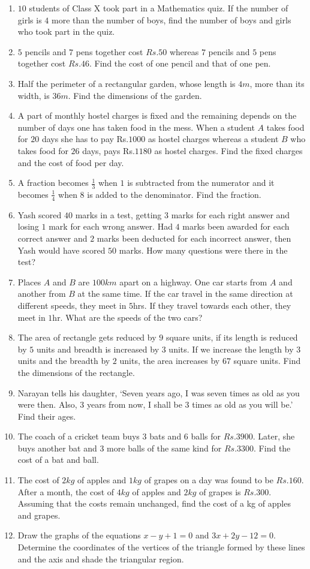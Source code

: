 \begin{enumerate}[label=\thesubsection.\arabic*,ref=\thesubsection.\theenumi, resume*]
\item $10$ students of Class X took part in a Mathematics quiz. If the number of girls is $4$ more than the number of boys, find the number of boys and girls who took part in the quiz.
\item $5$ pencils and $7$ pens together cost $Rs. 50$ whereas $7$ pencils and $5$ pens together cost $Rs. 46$. Find the cost of one pencil and that of one pen.
\item Half the perimeter of a rectangular garden, whose length is $4m$, more than its width, is $36m$. Find the dimensions of the garden.
\item A part of monthly hostel charges is fixed and the remaining depends on the number of days one has taken food in the mess. When a student $A$ takes food for $20$ days she has to pay Rs.$1000$ as hostel charges whereas a student $B$ who takes food for $26$ days, pays Rs.$1180$ as hostel charges. Find the fixed charges and the cost of food per day.
\item A fraction becomes $\frac{1}{3}$ when $1$ is subtracted from the numerator and it becomes $\frac{1}{4}$ when $8$ is added to the denominator. Find the fraction.
\item Yash scored $40$ marks in a test, getting $3$ marks for each right answer and losing $1$ mark for each wrong answer. Had $4$ marks been awarded for each correct answer and $2$ marks been deducted for each incorrect answer, then Yash would have scored $50$ marks. How many questions were there in the test?
\item Places $A$ and $B$ are $100km$ apart on a highway. One car starts from $A$ and another from $B$ at the same time. If the car travel in the same direction at different speeds, they meet in $5$hrs. If they travel towards each other, they meet in $1$hr. What are the speeds of the two cars?
\item The area of rectangle gets reduced by $9$ square units, if its length is reduced by $5$ units and breadth is increased by $3$ units. If we increase the length by $3$ units and the breadth by $2$ units, the area increases by $67$ square units. Find the dimensions of the rectangle.
\item Narayan tells his daughter, `Seven years ago, I was seven times as old as you were then. Also, $3$ years from now, I shall be $3$ times as old as  you will be.' Find their ages. 
\item The coach of a cricket team buys $3$ bats and $6$ balls for $Rs.3900$. Later, she buys another bat and $3$ more balls of the same kind for $Rs.3300$. Find the cost of a bat and ball.
\item The cost of $2kg$ of apples and $1kg$ of grapes on a day was found to be $Rs.160$. After a month, the cost of $4kg$ of apples and $2kg$ of grapes is $Rs.300$. Assuming that the costs remain unchanged, find the cost of a kg of apples and grapes. 
\item Draw the graphs of the equations $x-y+1=0$ and $3x+2y-12=0$. Determine the coordinates of the vertices of the triangle formed by these lines and the axis and shade the triangular region.
\end{enumerate}
